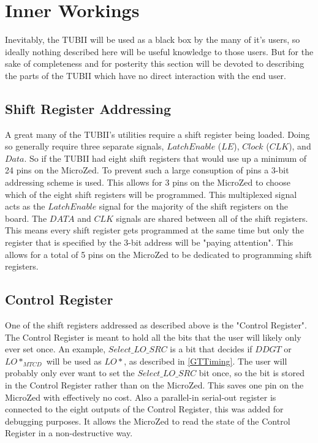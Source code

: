\documentclass[11pt,a4paper]{article}
\begin{document}
\section{Inner Workings}
Inevitably, the TUBII will be used as a black box by the many of it's users, so ideally nothing described here will be useful knowledge to those users. But for the sake of completeness and for posterity this section will be devoted to describing the parts of the TUBII which have no direct interaction with the end user.

\subsection{Shift Register Addressing}
\label{SR_Addr}
A great many of the TUBII's utilities require a shift register being loaded. Doing so generally require three separate signals, $Latch Enable$ ($LE$), $Clock$ ($CLK$), and $Data$.
So if the TUBII had eight shift registers that would use up a minimum of 24 pins on the MicroZed. To prevent such a large consuption of pins a 3-bit addressing scheme is used. This allows for 3 pins on the MicroZed to choose which of the eight shift registers will be programmed. This multiplexed signal acts as the $LatchEnable$ signal for the majority of the shift registers on the board. The $DATA$ and $CLK$ signals are shared between all of the shift registers. This means every shift register gets programmed at the same time but only the register that is specified by the 3-bit address will be "paying attention". This allows for a total of 5 pins on the MicroZed to be dedicated to programming shift registers.
\subsection{Control Register}
One of the shift registers addressed as described above is the "Control Register". The Control Register is meant to hold all the bits that the user will likely only ever set once. An example, $Select\_LO\_SRC$ is a bit that decides if $DDGT$ or $LO*_{MTCD}$ will be used as $LO*$, as described in \ref{GTTiming}. The user will probably only ever want to set the $Select\_LO\_SRC$ bit once, so the bit is stored in the Control Register rather than on the MicroZed. This saves one pin on the MicroZed with effectively no cost. Also a parallel-in serial-out register is connected to the eight outputs of the Control Register, this was added for debugging purposes. It allows the MicroZed to read the state of the Control Register in a non-destructive way. 
\end{document}
